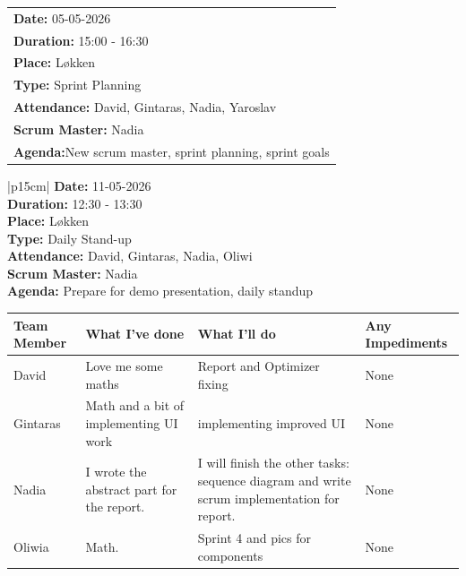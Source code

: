 \begin{table}[H]
    \centering
    \begin{tabular}{|p{15cm}|}   
        \hline
        \textbf{Date:}  05-05-2026 \\
        \textbf{Duration:} 15:00 - 16:30 \\
        \textbf{Place:}  Løkken \\
        \textbf{Type:} Sprint Planning \\
        \textbf{Attendance:}  David, Gintaras, Nadia, Yaroslav \\
        \textbf{Scrum Master:}  Nadia \\
        \textbf{Agenda:}New scrum master, sprint planning, sprint goals \\
        \hline
    \end{tabular}
\end{table}

\begin{table}[H]
    \centering
    \begin{tabular}{|p{15cm}|}   
        \hline
        \textbf{Date:}  11-05-2026 \\
        \textbf{Duration:} 12:30 - 13:30 \\
        \textbf{Place:}  Løkken \\
        \textbf{Type:}  Daily Stand-up \\
        \textbf{Attendance:} David, Gintaras, Nadia, Oliwi \\
        \textbf{Scrum Master:}  Nadia \\
        \textbf{Agenda:} Prepare for demo presentation, daily standup
        \begin{table}[H]
            \begin{tabular}{|p{1.75cm}|p{4cm}|p{4cm}|p{4cm}|}
                \hline
                \cellcolor[HTML]{BFBFBF}  \textbf{Team Member} & \cellcolor[HTML]{BFBFBF}  \textbf{What I've done} & \cellcolor[HTML]{BFBFBF}  \textbf{What I'll do} & \cellcolor[HTML]{BFBFBF}  \textbf{Any Impediments}\\
                \hline
                \cellcolor[HTML]{d4d4d4} David & Love me some maths & Report and Optimizer fixing & None \\
                \hline
                \cellcolor[HTML]{d4d4d4} Gintaras & Math and a bit of implementing UI work & implementing improved UI & None \\
                \hline
                \cellcolor[HTML]{d4d4d4} Nadia & I wrote the abstract part for the report. & I will finish the other tasks: sequence diagram and write scrum implementation for report. & None \\
                \hline
                \cellcolor[HTML]{d4d4d4} Oliwia & Math. & Sprint 4 and pics for components & None \\
                \hline
            \end{tabular}
        \end{table}\\
        \hline
    \end{tabular}
\end{table}


